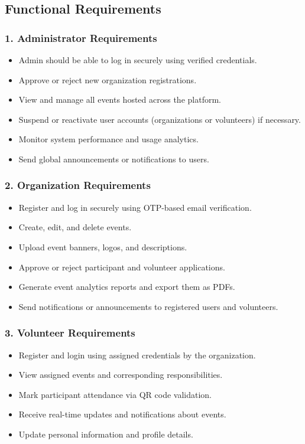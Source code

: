 \documentclass[12pt,a4paper]{report}
\begin{document}
\subsection{Functional Requirements}

\subsubsection*{1. Administrator Requirements}
\begin{itemize}
    \item Admin should be able to log in securely using verified credentials.
    \item Approve or reject new organization registrations.
    \item View and manage all events hosted across the platform.
    \item Suspend or reactivate user accounts (organizations or volunteers) if necessary.
    \item Monitor system performance and usage analytics.
    \item Send global announcements or notifications to users.
\end{itemize}

\subsubsection*{2. Organization Requirements}
\begin{itemize}
    \item Register and log in securely using OTP-based email verification.
    \item Create, edit, and delete events.
    \item Upload event banners, logos, and descriptions.
    \item Approve or reject participant and volunteer applications.
    \item Generate event analytics reports and export them as PDFs.
    \item Send notifications or announcements to registered users and volunteers.
\end{itemize}

\subsubsection*{3. Volunteer Requirements}
\begin{itemize}
    \item Register and login using assigned credentials by the organization.
    \item View assigned events and corresponding responsibilities.
    \item Mark participant attendance via QR code validation.
    \item Receive real-time updates and notifications about events.
    \item Update personal information and profile details.
\end{itemize}
\end{document}
